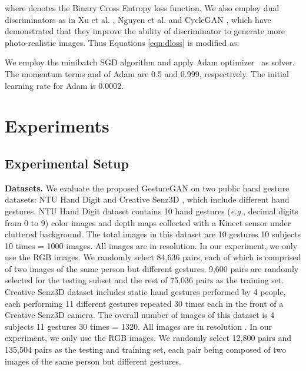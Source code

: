 \documentclass[sigconf]{acmart}
\begin{document}
where  denotes the Binary Cross Entropy loss function.
We also employ dual discriminators as in Xu et al. \cite{xu2017face}, Nguyen et al. \cite{nguyen2017dual} and CycleGAN \cite{zhu2017unpaired}, which have demonstrated that they improve the ability of discriminator to generate more photo-realistic images.
Thus Equations \ref{eqn:dloss} is modified as: 
\vspace{-0.1cm}

We employ the minibatch SGD algorithm and apply Adam optimizer~\cite{kingma2014adam} as solver. The momentum terms  and   of Adam are 0.5 and 0.999, respectively.  
The initial learning rate for Adam is 0.0002.


\section{Experiments}
\label{sec:experiment}

\subsection{Experimental Setup}
\noindent \textbf{Datasets.}
We evaluate the proposed GestureGAN on two public hand gesture datasets: NTU Hand Digit \cite{ren2013robust} and Creative Senz3D \cite{memo2016head}, which include different hand gestures.
NTU Hand Digit dataset \cite{ren2013robust} contains 10 hand gestures (\textit{e.g.}, decimal digits from 0 to 9) color images
and depth maps collected with a Kinect sensor under cluttered background.
The total images in this dataset are 10 gestures  10 subjects  10 times = 1000 images.
All images are in  resolution.
In our experiment, we only use the RGB images.
We randomly select 84,636 pairs, each of which is comprised of two images of the same person but different gestures.
9,600 pairs are randomly selected for the testing subset and the rest of 75,036 pairs as the training set.
Creative Senz3D dataset \cite{memo2016head} includes static hand gestures performed by 4 people, each performing 11 different gestures repeated 30 times each in
the front of a Creative Senz3D camera.
The overall number of images of this dataset is 4 subjects  11 gestures  30 times = 1320.
All images are in resolution .
In our experiment, we only use the RGB images.
We randomly select 12,800 pairs and 135,504 pairs as the testing and training set, each pair being composed of two images of the same person but different gestures.
\end{document}
